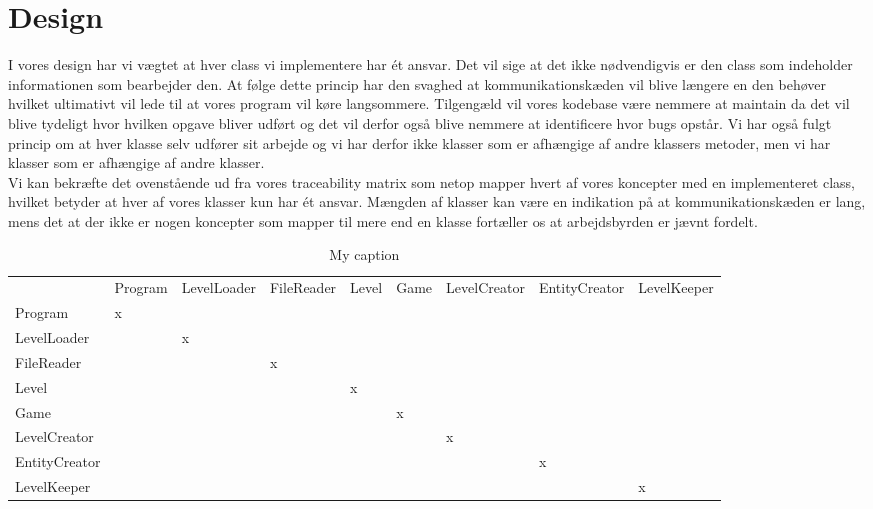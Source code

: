 \section{Design}
I vores design har vi vægtet at hver class vi implementere har ét ansvar. Det vil sige at det ikke nødvendigvis er den class som indeholder informationen som bearbejder den. At følge dette princip har den svaghed at kommunikationskæden vil blive længere en den behøver hvilket ultimativt vil lede til at vores program vil køre langsommere. Tilgengæld vil vores kodebase være nemmere at maintain da det vil blive tydeligt hvor hvilken opgave bliver udført og det vil derfor også blive nemmere at identificere hvor bugs opstår. Vi har også fulgt princip om at hver klasse selv udfører sit arbejde og vi har derfor ikke klasser som er afhængige af andre klassers metoder, men vi har klasser som er afhængige af andre klasser.\\
Vi kan bekræfte det ovenstående ud fra vores traceability matrix som netop mapper hvert af vores koncepter med en implementeret class, hvilket betyder at hver af vores klasser kun har ét ansvar. Mængden af klasser kan være en indikation på at kommunikationskæden er lang, mens det at der ikke er nogen koncepter som mapper til mere end en klasse fortæller os at arbejdsbyrden er jævnt fordelt.\\

\begin{table}[]
\centering
\caption{My caption}
\label{my-label}
\begin{tabular}{lllllllll}
              & Program & LevelLoader & FileReader & Level & Game & LevelCreator & EntityCreator & LevelKeeper \\
Program       & x       &             &            &       &      &              &               &             \\
LevelLoader   &         & x           &            &       &      &              &               &             \\
FileReader    &         &             & x          &       &      &              &               &             \\
Level         &         &             &            & x     &      &              &               &             \\
Game          &         &             &            &       & x    &              &               &             \\
LevelCreator  &         &             &            &       &      & x            &               &             \\
EntityCreator &         &             &            &       &      &              & x             &             \\
LevelKeeper   &         &             &            &       &      &              &               & x          
\end{tabular}
\end{table}


